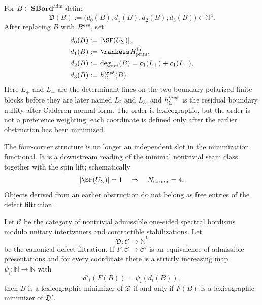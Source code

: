 \begin{definition}
\label{def:canonical-defect-filtration}
For $B\in\mathbf{SBord}^{\mathrm{adm}}$ define
\begin{equation}
\mathfrak D(B):=\bigl(d_0(B),d_1(B),d_2(B),d_3(B)\bigr)\in\mathbb N^4.
\end{equation}
After replacing $B$ with $B^{\textup{ess}}$, set
\begin{align}
d_0(B)&:=|\SF(U_\Sigma)|,\\
d_1(B)&:=\rankess H_{\mathrm{prim}}^{\mathrm{fin}},\\
d_2(B)&:=\deg_{\det}^{+}(B)=c_1(L_+)+c_1(L_-),\\
d_3(B)&:=h_\Sigma^{\red}(B).
\end{align}
Here $L_+$ and $L_-$ are the determinant lines on the two boundary-polarized finite blocks before
they are later named $L_2$ and $L_3$, and $h_\Sigma^{\red}$ is the residual boundary nullity after
Calderon normal form. The order is lexicographic, but the order is not a preference weighting: each
coordinate is defined only after the earlier obstruction has been minimized.
\end{definition}

\begin{remark}
The four-corner structure is no longer an independent slot in the minimization functional. It is a
downstream reading of the minimal nontrivial seam class together with the spin lift; schematically
\begin{equation}
|\SF(U_\Sigma)|=1\quad\Rightarrow\quad N_{\rm corner}=4.
\end{equation}
Objects derived from an earlier obstruction do not belong as free entries of the defect filtration.
\end{remark}

\begin{theorem}
Let $\mathcal C$ be the category of nontrivial admissible one-sided spectral bordisms modulo unitary
intertwiners and contractible stabilizations. Let
\begin{equation}
\mathfrak D:\mathcal C\to\mathbb N^k
\end{equation}
be the canonical defect filtration. If $F:\mathcal C\to\mathcal C'$ is an equivalence of admissible
presentations and for every coordinate there is a strictly increasing map
$\psi_i:\mathbb N\to\mathbb N$ with
\begin{equation}
d'_i(F(B))=\psi_i(d_i(B)),
\end{equation}
then $B$ is a lexicographic minimizer of $\mathfrak D$ if and only if $F(B)$ is a lexicographic
minimizer of $\mathfrak D'$.
\end{theorem}


